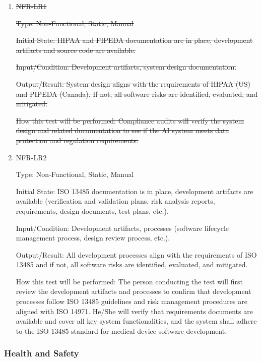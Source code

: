 \documentclass[12pt, titlepage]{article}
\begin{document}
\begin{enumerate}

\item{\sout{NFR-LR1}\\}\label{NFR-LR1}

\sout{Type: Non-Functional, Static, Manual}

\sout{Initial State: HIPAA and PIPEDA documentation are in place, development artifacts and source code are available.}

\sout{Input/Condition: Development artifacts, system design documentation.}

\sout{Output/Result: System design aligns with the requirements of HIPAA (US) and PIPEDA (Canada). If not, all software risks are identified, evaluated, and mitigated.}

\sout{How this test will be performed: Compliance audits will verify the system design and related documentation to see if the AI system meets data protection and regulation requirements.}



\item{NFR-LR2\\}\label{NFR-LR2}

Type: Non-Functional, Static, Manual

Initial State: ISO 13485 documentation is in place, development artifacts are available (verification and validation plans, risk analysis reports, requirements, design documents, test plans, etc.).

Input/Condition: Development artifacts, processes (software lifecycle management process, design review process, etc.).

Output/Result: All development processes align with the requirements of ISO 13485 and if not, all software risks are identified, evaluated, and mitigated.

How this test will be performed: The person conducting the test will first review the development artifacts and processes to confirm that development processes follow ISO 13485 guidelines and risk management procedures are aligned with ISO 14971. He/She will verify that requirements documents are available and cover all key system functionalities, and the system shall adhere to the ISO 13485 standard for medical device software development.

\end{enumerate}

\subsubsection{Health and Safety}
\end{document}

